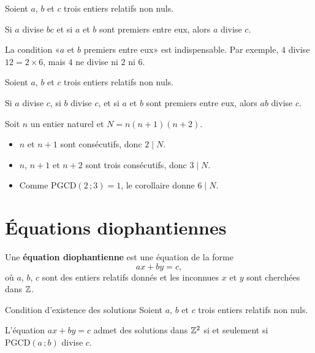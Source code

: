 \begin{theoreme}
	Soient $a$, $b$ et $c$ trois entiers relatifs non nuls.

	Si $a$ divise $bc$ et si $a$ et $b$ sont premiers entre eux, alors $a$ divise $c$.
\end{theoreme}

\remarque
La condition «$a$ et $b$ premiers entre eux» est indispensable.
Par exemple, $4$ divise $12 = 2 \times 6$, mais $4$ ne divise ni $2$ ni $6$.

\begin{corollaire}
	Soient $a$, $b$ et $c$ trois entiers relatifs non nuls.

	Si $a$ divise $c$, si $b$ divise $c$, et si $a$ et $b$ sont premiers entre eux,
	alors $ab$ divise $c$.
\end{corollaire}

\begin{exemple}
	Soit $n$ un entier naturel et $N = n(n+1)(n+2)$.
	\begin{itemize}[label=\textbullet]
		\item $n$ et $n+1$ sont consécutifs, donc $2 \mid N$.
		\item $n$, $n+1$ et $n+2$ sont trois consécutifs, donc $3 \mid N$.
		\item Comme $\mathrm{PGCD}(2\,;3) = 1$, le corollaire donne $6 \mid N$.
	\end{itemize}
\end{exemple}


\section{Équations diophantiennes}

\begin{definition}
	Une \textbf{équation diophantienne} est une équation de la forme
	$$
	ax + by = c,
	$$
	où $a$, $b$, $c$ sont des entiers relatifs donnés et les inconnues $x$ et $y$ sont cherchées
	dans $\mathbb{Z}$.
\end{definition}

\begin{propriete}{Condition d'existence des solutions}{}
	Soient $a$, $b$ et $c$ trois entiers relatifs non nuls.

	L'équation $ax + by = c$ admet des solutions dans $\mathbb{Z}^2$ si et seulement si
	$\mathrm{PGCD}(a\,;b)$ divise $c$.
\end{propriete}

